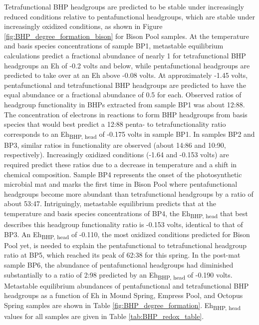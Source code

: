 Tetrafunctional BHP headgroups are predicted to be stable under increasingly reduced conditions relative to pentafunctional headgroups, which are stable under increasingly oxidized conditions, as shown in Figure \ref{fig:BHP_degree_formation_bison} for Bison Pool samples. At the temperature and basis species concentrations of sample BP1, metastable equilibrium calculations predict a fractional abundance of nearly 1 for tetrafunctional BHP headgroups an Eh of -0.2 volts and below, while pentafunctional headgroups are predicted to take over at an Eh above -0.08 volts. At approximately -1.45 volts, pentafunctional and tetrafunctional BHP headgroups are predicted to have the equal abundance or a fractional abundance of 0.5 for each. Observed ratios of headgroup functionality in BHPs extracted from sample BP1 was about 12:88. The concentration of electrons in reactions to form BHP headgroups from basis species that would best predict a 12:88 penta- to tetrafunctionality ratio corresponds to an Eh\textsubscript{BHP, head} of -0.175 volts in sample BP1. In samples BP2 and BP3, similar ratios in functionality are observed (about 14:86 and 10:90, respectively). Increasingly oxidized conditions (-1.64 and -0.153 volts) are required predict these ratios due to a decrease in temperature and a shift in chemical composition. Sample BP4 represents the onset of the photosynthetic microbial mat and marks the first time in Bison Pool where pentafunctional headgroups become more abundant than tetrafunctional headgroups by a ratio of about 53:47. Intriguingly, metastable equilibrium predicts that at the temperature and basis species concentrations of BP4, the Eh\textsubscript{BHP, head} that best describes this headgroup functionality ratio is -0.153 volts, identical to that of BP3. An Eh\textsubscript{BHP, head} of -0.110, the most oxidized conditions predicted for Bison Pool yet, is needed to explain the pentafunctional to tetrafunctional headgroup ratio at BP5, which reached its peak of 62:38 for this spring. In the post-mat sample BP6, the abundance of pentafunctional headgroups had diminished substantially to a ratio of 2:98 predicted by an Eh\textsubscript{BHP, head} of -0.190 volts. Metastable equilibrium abundances of pentafunctional and tetrafunctional BHP headgroups as a function of Eh in Mound Spring, Empress Pool, and Octopus Spring samples are shown in Table \ref{fig:BHP_degree_formation}. Eh\textsubscript{BHP, head} values for all samples are given in Table \ref{tab:BHP_redox_table}.

